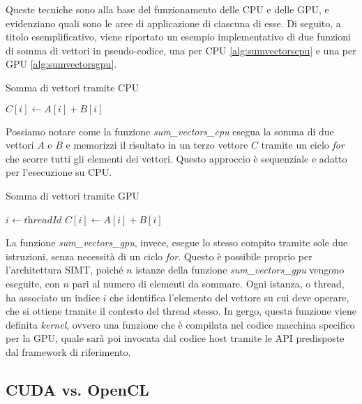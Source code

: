 \vspace{1em}

Queste tecniche sono alla base del funzionamento delle CPU e delle GPU, e evidenziano
quali sono le aree di applicazione di ciascuna di esse. Di seguito, a titolo esemplificativo,
viene riportato un esempio implementativo di due funzioni di somma di vettori in
pseudo-codice, una per CPU \ref{alg:sumvectorscpu} e una per GPU \ref{alg:sumvectorsgpu}.

\begin{algorithm}
  \caption{Somma di vettori tramite CPU}
  \label{alg:sumvectorscpu}
  \begin{algorithmic}
      \State
    $C[i] \gets A[i] + B[i]$ \EndFor \EndFunction
  \end{algorithmic}
\end{algorithm}

Possiamo notare come la funzione \textit{sum\_vectors\_cpu} esegua la somma di due
vettori $A$ e $B$ e memorizzi il risultato in un terzo vettore $C$ tramite un ciclo
\textit{for} che scorre tutti gli elementi dei vettori. Questo approccio è sequenziale
e adatto per l'esecuzione su CPU.

\begin{algorithm}
  \caption{Somma di vettori tramite GPU}
  \label{alg:sumvectorsgpu}
  \begin{algorithmic}
     \State $i \gets \textit{threadId}$ \State
    $C[i] \gets A[i] + B[i]$ \EndFunction
  \end{algorithmic}
\end{algorithm}

La funzione \textit{sum\_vectors\_gpu}, invece, esegue lo stesso compito tramite
sole due istruzioni, senza necessità di un ciclo \textit{for}. Questo è
possibile proprio per l'architettura SIMT, poiché $n$ istanze della funzione \textit{sum\_vectors\_gpu}
vengono eseguite, con $n$ pari al numero di elementi da sommare. Ogni istanza, o
thread, ha associato un indice $i$ che identifica l'elemento del vettore su cui
deve operare, che si ottiene tramite il contesto del thread stesso. In gergo, questa
funzione viene definita \textit{kernel}, ovvero una funzione che è compilata nel
codice macchina specifico per la GPU, quale sarà poi invocata dal codice host
tramite le API predisposte dal framework di riferimento.

\subsection{CUDA vs. OpenCL}
\label{subsec:cudavsopencl}

